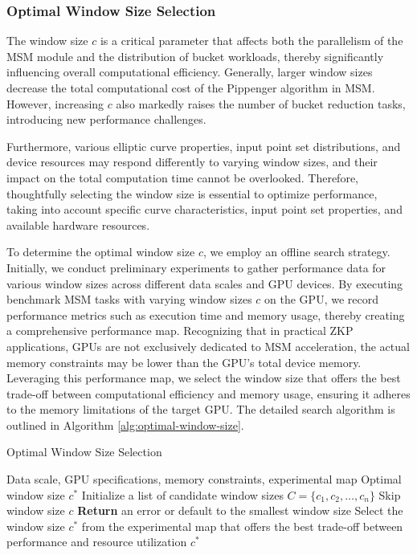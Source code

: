 \documentclass[conference]{IEEEtran}
\begin{document}
\subsubsection{\textbf{Optimal Window Size Selection}}

The window size \( c \) is a critical parameter that affects both the parallelism of the MSM module and the distribution of bucket workloads, thereby significantly influencing overall computational efficiency. Generally, larger window sizes decrease the total computational cost of the Pippenger algorithm in MSM. However, increasing \( c \) also markedly raises the number of bucket reduction tasks, introducing new performance challenges.

Furthermore, various elliptic curve properties, input point set distributions, and device resources may respond differently to varying window sizes, and their impact on the total computation time cannot be overlooked. Therefore, thoughtfully selecting the window size is essential to optimize performance, taking into account specific curve characteristics, input point set properties, and available hardware resources.

To determine the optimal window size \( c \), we employ an offline search strategy. Initially, we conduct preliminary experiments to gather performance data for various window sizes across different data scales and GPU devices. By executing benchmark MSM tasks with varying window sizes \( c \) on the GPU, we record performance metrics such as execution time and memory usage, thereby creating a comprehensive performance map. Recognizing that in practical ZKP applications, GPUs are not exclusively dedicated to MSM acceleration, the actual memory constraints may be lower than the GPU's total device memory. Leveraging this performance map, we select the window size that offers the best trade-off between computational efficiency and memory usage, ensuring it adheres to the memory limitations of the target GPU. The detailed search algorithm is outlined in Algorithm \ref{alg:optimal-window-size}.
\begin{algorithm}
    \caption{Optimal Window Size Selection}
    \label{alg:optimal-window-size}
    \begin{algorithmic}[1]
    \REQUIRE Data scale, GPU specifications, memory constraints, experimental map
    \ENSURE Optimal window size \( c^* \)
    \STATE Initialize a list of candidate window sizes \( C = \{c_1, c_2, \ldots, c_n\} \)
            \STATE Skip window size \( c \)
        \ENDIF
    \ENDFOR
        \STATE \textbf{Return} an error or default to the smallest window size
    \ELSE
        \STATE Select the window size \( c^* \) from the experimental map that offers the best trade-off between performance and resource utilization
    \ENDIF
    \RETURN \( c^* \)
    \end{algorithmic}
\end{algorithm}
\end{document}
